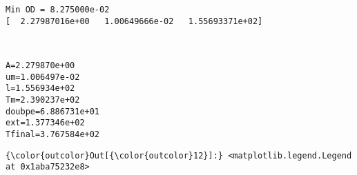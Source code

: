 \documentclass[11pt]{article}
\begin{document}
    \begin{Verbatim}[commandchars=\\\{\}]
Min OD = 8.275000e-02
[  2.27987016e+00   1.00649666e-02   1.55693371e+02]

    \end{Verbatim}

    \begin{center}
    \end{center}
    { \hspace*{\fill} \\}
    
    \begin{Verbatim}[commandchars=\\\{\}]
A=2.279870e+00
um=1.006497e-02
l=1.556934e+02
Tm=2.390237e+02
doubpe=6.886731e+01
ext=1.377346e+02
Tfinal=3.767584e+02

    \end{Verbatim}

            \begin{Verbatim}[commandchars=\\\{\}]
{\color{outcolor}Out[{\color{outcolor}12}]:} <matplotlib.legend.Legend at 0x1aba75232e8>
\end{Verbatim}
        
    \begin{center}
    \end{center}
    { \hspace*{\fill} \\}
    
    \begin{center}
    \end{center}
    { \hspace*{\fill} \\}
    
\end{document}
